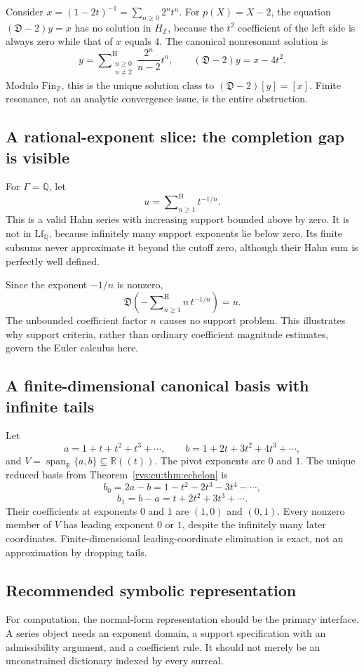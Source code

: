 \documentclass[11pt,letterpaper]{article}
\numberwithin{equation}{section}
\theoremstyle{definition}
\theoremstyle{remark}
\newcommand{\R}{\mathbb{R}}
\newcommand{\Q}{\mathbb{Q}}
\newcommand{\Z}{\mathbb{Z}}
\newcommand{\Span}{\operatorname{span}}
\newcommand{\hSum}{\mathop{\sum}\nolimits^{\mathrm H}}
\newcommand{\EuD}{\mathfrak D}%
\newcommand{\FinS}[1]{\mathrm{Fin}_{#1}}%
\newcommand{\LfS}[1]{\mathrm{Lf}_{#1}}%
\begin{document}
Consider $x=(1-2t)^{-1}=\sum_{n\ge0}2^nt^n$. For $p(X)=X-2$, the equation $(\EuD-2)y=x$ has no solution in $H_\Z$, because the $t^2$ coefficient of the left side is always zero while that of $x$ equals $4$. The canonical nonresonant solution is
\[
 y=\hSum_{\substack{n\ge0\\n\ne2}}\frac{2^n}{n-2}t^n,
 \qquad (\EuD-2)y=x-4t^2.
\]
Modulo $\FinS{\Z}$, this is the unique solution class to $(\EuD-2)[y]=[x]$. Finite resonance, not an analytic convergence issue, is the entire obstruction.

\subsection{A rational-exponent slice: the completion gap is visible}
For $\Gamma=\Q$, let
\[
 u=\hSum_{n\ge1}t^{-1/n}.
\]
This is a valid Hahn series with increasing support bounded above by zero. It is not in $\LfS{\Q}$, because infinitely many support exponents lie below zero. Its finite subsums never approximate it beyond the cutoff zero, although their Hahn sum is perfectly well defined.

Since the exponent $-1/n$ is nonzero,
\[
 \EuD\left(-\hSum_{n\ge1} n\,t^{-1/n}\right)=u.
\]
The unbounded coefficient factor $n$ causes no support problem. This illustrates why support criteria, rather than ordinary coefficient magnitude estimates, govern the Euler calculus here.

\subsection{A finite-dimensional canonical basis with infinite tails}
Let
\[
 a=1+t+t^2+t^3+\cdots,\qquad b=1+2t+3t^2+4t^3+\cdots,
\]
and $V=\Span_\R\{a,b\}\subseteq\R((t))$. The pivot exponents are $0$ and $1$. The unique reduced basis from Theorem~\ref{rvs:eu:thm:echelon} is
\[
 b_0=2a-b=1-t^2-2t^3-3t^4-\cdots,
\]
\[
 b_1=b-a=t+2t^2+3t^3+\cdots.
\]
Their coefficients at exponents $0$ and $1$ are $(1,0)$ and $(0,1)$. Every nonzero member of $V$ has leading exponent $0$ or $1$, despite the infinitely many later coordinates. Finite-dimensional leading-coordinate elimination is exact, not an approximation by dropping tails.

\subsection{Recommended symbolic representation}
For computation, the normal-form representation should be the primary interface. A series object needs an exponent domain, a support specification with an admissibility argument, and a coefficient rule. It should not merely be an unconstrained dictionary indexed by every surreal.
\end{document}
